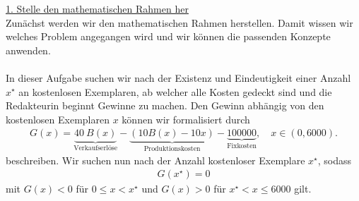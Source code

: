 \underline{1. Stelle den mathematischen Rahmen her}\\
Zunächst werden wir den mathematischen Rahmen herstellen. Damit wissen wir welches Problem angegangen wird und wir können die passenden Konzepte anwenden.\\
\\
In dieser Aufgabe suchen wir nach der Existenz und Eindeutigkeit einer Anzahl $x^\star $ an kostenlosen Exemplaren, ab welcher alle Kosten gedeckt sind und die Redakteurin beginnt Gewinne zu machen. Den Gewinn abhängig von den kostenlosen Exemplaren $x$ können wir formalisiert durch
\begin{align*}
	G(x) = \underbrace{40 \ B(x)}_{\textrm{Verkaufserlöse}} - \underbrace{(10 B(x) - 10 x)}_{\textrm{Produktionskosten}} - \underbrace{100000}_{\textrm{Fixkosten}}, \quad
	x \in (0, 6000).
\end{align*}
beschreiben. Wir suchen nun nach der Anzahl kostenloser Exemplare $x^\star$, sodass 
\begin{align*}
G(x^\star ) = 0
\end{align*}
mit $G(x) < 0$ für $0 \leq x < x^\star$ und $G(x) > 0$ für $x^\star < x \leq 6000$ gilt.\\
\\

